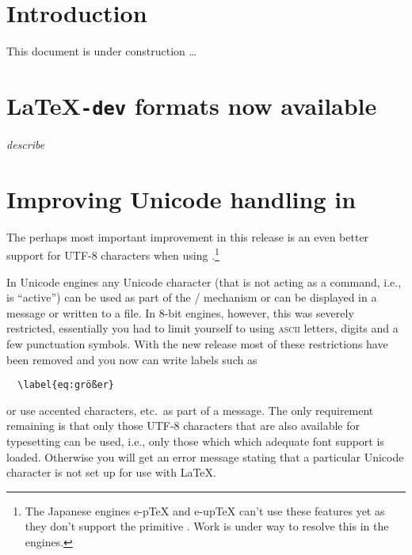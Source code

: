 \documentclass{ltnews}
\providecommand\acro[1]{\textsc{#1}}
\providecommand\pdfTeX{\hologo{pdfTeX}}
\begin{document}

\maketitle
\tableofcontents

\setlength{}

\bigskip

\section{Introduction}

This document is under construction \ldots


\section{\LaTeX\texttt{-dev} formats now available}

\emph{describe}



\section{Improving Unicode handling in \pdfTeX{}}

The perhaps most important improvement in this release is an even
better support for UTF-8 characters when using \pdfTeX{}.\footnote{The
  Japanese engines e-p\TeX{} and e-up\TeX{} can't use these features
  yet as they don't support the primitive . Work is
  under way to resolve this in the engines.}

In Unicode engines any Unicode character (that is not acting as a
command, i.e., is \enquote{active}) can be used as part of the
/ mechanism or can be displayed in a message or
written to a file. In 8-bit engines, however, this was severely
restricted, essentially you had to limit yourself to using
\acro{ascii} letters, digits and a few punctuation symbols.  With the
new release most of these restrictions have been removed and you now
can write labels such as
\begin{verbatim}
  \label{eq:größer}
\end{verbatim}
or use accented characters, etc.\ as part of a  message.
The only requirement remaining is that only those UTF-8 characters
that are also available for typesetting can be used, i.e., only those
which which adequate font support is loaded. Otherwise you will get an
error message stating that a particular Unicode character is not set
up for use with \LaTeX{}.
\end{document}
